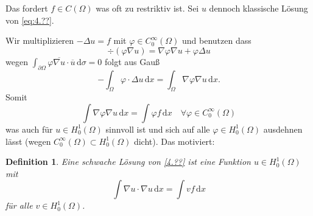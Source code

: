 \documentclass[
paper=a4,
bibtotocnumbered,
liststotocnumbered,
tablecaptionabove,
pointlessnumbers,
twoside,
openright,
10pt
]
{report}
\let\phi\varphi
\newtheorem{df}[thm]{Definition}
\theoremstyle{definition}
\numberwithin{equation}{chapter}
\begin{document}
Das fordert $f\in C(\Omega)$ was oft zu restriktiv ist. Sei $u$ dennoch klassische Lösung von \eqref{eq:4.??}. 

Wir multiplizieren $-\Delta u=f$ mit $\phi \in C_0^\infty(\Omega)$ und benutzen dass
\begin{equation}
\div(\phi \nabla u) = \nabla \phi \nabla u + \phi \Delta u
\end{equation}
wegen $\int_{\partial\Omega} \phi \overline{\nabla u} \cdot \overline u \, \mathrm d\sigma =0$ folgt aus Gauß
\begin{equation}
-\int_\Omega \phi \cdot \Delta u \, \mathrm dx = \int_\Omega \nabla \phi \nabla u \, \mathrm dx.
\end{equation}
Somit
\begin{equation}
\int \nabla \phi \nabla u \, \mathrm dx = \int \phi f \, \mathrm dx \quad \forall \phi \in C_0^\infty(\Omega)
\end{equation}
was auch für $u\in H_0^1(\Omega)$ sinnvoll ist und sich auf alle $\phi \in H_0^1(\Omega)$ ausdehnen lässt (wegen $C_0^\infty(\Omega)\subset H_0^1(\Omega)$ dicht).  Das motiviert:
\begin{df}
Eine schwache Lösung von \eqref{4.??} ist eine Funktion $u\in H_0^1(\Omega)$ mit
\begin{equation}
\int \nabla u \cdot \nabla u \, \mathrm dx = \int v f\, \mathrm dx
\end{equation}
für alle $v\in H_0^1(\Omega)$.
\end{df}
\end{document}
